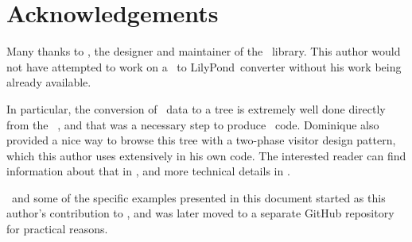 
\chapter{Acknowledgements}



Many thanks to \fober, the designer and maintainer of the \libmusicxml\ library. This author would not have attempted to work on a \mxml\ to LilyPond\ converter without his work being already available.

In particular, the conversion of \mxml\ data to a tree is extremely well done directly from the \mxml\ \dtd, and that was a necessary step to produce \lily\ code. Dominique also provided a nice way to browse this tree with a two-phase visitor design pattern, which this author uses extensively in his own code. The interested reader can find information about that in , and more technical details in .

\xmlToLy\ and some of the specific examples presented in this document started as this author's contribution to \libmusicxml, and was later moved to a separate GitHub repository for practical reasons.

